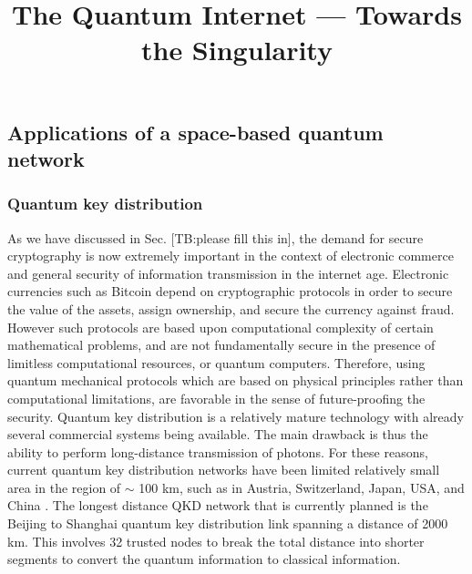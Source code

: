\documentclass[aps,rmp,reprint,amsmath,amssymb,graphicx,longbibliography]{revtex4-1}
\begin{document}
\title{The Quantum Internet --- Towards the Singularity}

\maketitle






\subsection{Applications of a space-based quantum network}

\subsubsection{Quantum key distribution}

As we have discussed in Sec. [TB:please fill this in], the demand for secure cryptography is now extremely important in the context of electronic commerce and general security of information transmission in the internet age. Electronic currencies such as Bitcoin depend on cryptographic protocols in order to secure the value of the assets, assign ownership, and secure the currency against fraud.  However such protocols are based upon computational complexity of certain mathematical problems, and are not fundamentally secure in the presence of limitless computational resources, or quantum computers.  Therefore, using quantum mechanical protocols which are based on physical principles rather than computational limitations, are favorable in the sense of future-proofing the security.  Quantum key distribution is a relatively mature technology with already several commercial systems being available.  The main drawback is thus the ability to perform long-distance transmission of photons.  For these reasons, current quantum key distribution networks have been limited relatively small area in the region of $ \sim $ 100 km, such as in Austria, Switzerland, Japan, USA, and China \cite{lo2014secure}.   The longest distance QKD network that is currently planned is the Beijing to Shanghai quantum key distribution link spanning a distance of 2000 km.  This involves 32 trusted nodes to break the total distance into shorter segments to convert the quantum information to classical information.  
\end{document}
